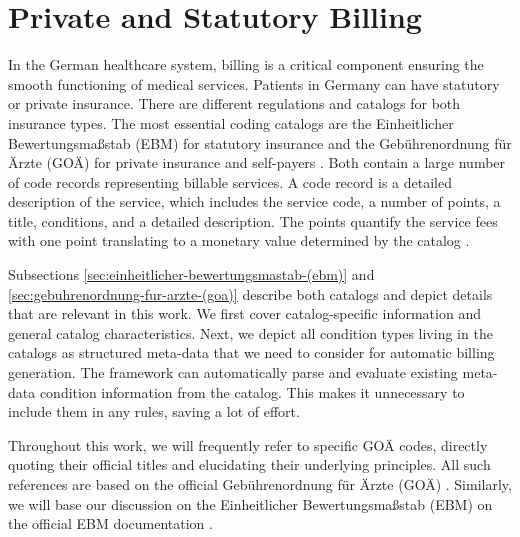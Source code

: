 \chapter{Private and Statutory Billing}\label{ch:billing-in-the-german-healthcare-system}

In the German healthcare system, billing is a critical component ensuring the smooth functioning of medical services.
Patients in Germany can have statutory or private insurance.
There are different regulations and catalogs for both insurance types.
The most essential coding catalogs are the Einheitlicher Bewertungsmaßstab (EBM) for statutory insurance and the Gebührenordnung für Ärzte (GOÄ) for private insurance and self-payers \cite{Stausberg1998}.
Both contain a large number of code records representing billable services.
A code record is a detailed description of the service, which includes the service code, a number of points, a title, conditions, and a detailed description.
The points quantify the service fees with one point translating to a monetary value determined by the catalog \cite{Stausberg1998}.

Subsections \ref{sec:einheitlicher-bewertungsmastab-(ebm)} and \ref{sec:gebuhrenordnung-fur-arzte-(goa)} describe both catalogs and depict details that are relevant in this work.
We first cover catalog-specific information and general catalog characteristics.
Next, we depict all condition types living in the catalogs as structured meta-data that we need to consider for automatic billing generation.
The framework can automatically parse and evaluate existing meta-data condition information from the catalog.
This makes it unnecessary to include them in any rules, saving a lot of effort.

Throughout this work, we will frequently refer to specific GOÄ codes, directly quoting their official titles and elucidating their underlying principles.
All such references are based on the official Gebührenordnung für Ärzte (GOÄ) \cite{bruck1998kommentar, hermanns2011gebuhrenordnung}.
Similarly, we will base our discussion on the Einheitlicher Bewertungsmaßstab (EBM) on the official EBM documentation \cite{hermanns2015ebm}.



